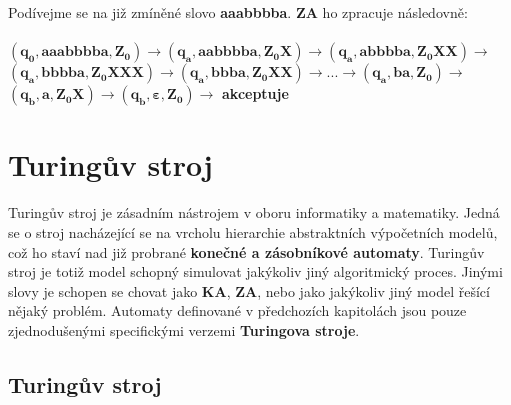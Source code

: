 \documentclass{report}
\begin{document}
Podívejme se na již zmíněné slovo \textbf{aaabbbba}. \textbf{ZA} ho zpracuje následovně:\\ \\
$\mathbf{(q_0,aaabbbba,Z_0)\rightarrow(q_a,aabbbba,Z_0X)\rightarrow(q_a,abbbba,Z_0XX)\rightarrow}$\\$\mathbf{(q_a,bbbba,Z_0XXX)\rightarrow(q_a,bbba,Z_0XX)\rightarrow ... \rightarrow (q_a,ba,Z_0)\rightarrow}$\\$\mathbf{(q_b,a,Z_0X)\rightarrow(q_b,\varepsilon,Z_0)\rightarrow}$ \textbf{akceptuje}
\setcounter{chapter}{6}
\setcounter{section}{0}
\chapter*{Turingův stroj}
Turingův stroj je zásadním nástrojem v oboru informatiky a matematiky. Jedná se o stroj nacházející se na vrcholu hierarchie abstraktních výpočetních modelů, což ho staví nad již probrané \textbf{konečné a zásobníkové automaty}. Turingův stroj je totiž model schopný simulovat jakýkoliv jiný algoritmický proces. Jinými slovy je schopen se chovat jako \textbf{KA}, \textbf{ZA}, nebo jako jakýkoliv jiný model řešící nějaký problém. Automaty definované v předchozích kapitolách jsou pouze zjednodušenými specifickými verzemi \textbf{Turingova stroje}.
\section{Turingův stroj}
\end{document}
